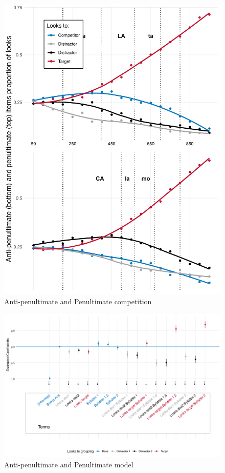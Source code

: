 \begin{figure}[H]
  \centering
  \includegraphics[width=0.6\linewidth]{visuals/pen_vs_anti_pen.jpeg} %
  \caption{Anti-penultimate and Penultimate competition}
  \label{fig:raw_pen_vs_anti}
\end{figure}

\begin{figure}[H]
  \centering
  \includegraphics[width=1\linewidth]{visuals/pen_vs_anti_pen_model.jpeg} %
  \caption{Anti-penultimate and Penultimate model}
  \label{fig:model_pen_vs_anti}
\end{figure}

